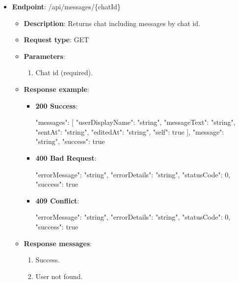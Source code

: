 \begin{itemize}
    \item \textbf{Endpoint}: /api/messages/\{chatId\}
    \begin{itemize}
        \item \textbf{Description}: Returns chat including messages by chat id.
        \item \textbf{Request type}: GET
        \item \textbf{Parameters}:
        \begin{enumerate}
            \item Chat id (required).
        \end{enumerate}
        \item \textbf{Response example}:
        \begin{itemize}
            \item \textbf{200 Success}:
            \begin{spverbatim}
            {
                "messages": [
                    {
                        "userDisplayName": "string",
                        "messageText": "string",
                        "sentAt": "string",
                        "editedAt": "string",
                        "self": true
                    }
                ],
                "message": "string",
                "success": true
            }
            \end{spverbatim}
            \item \textbf{400 Bad Request}:
            \begin{spverbatim}
            {
                "errorMessage": "string",
                "errorDetails": "string",
                "statusCode": 0,
                "success": true
            }
            \end{spverbatim}
            \item \textbf{409 Conflict}:
            \begin{spverbatim}
            {
                "errorMessage": "string",
                "errorDetails": "string",
                "statusCode": 0,
                "success": true
            }
            \end{spverbatim}
        \end{itemize}
        \item \textbf{Response messages}:
        \begin{enumerate}
            \item Success.
            \item User not found.
        \end{enumerate}
    \end{itemize}


\end{itemize}
